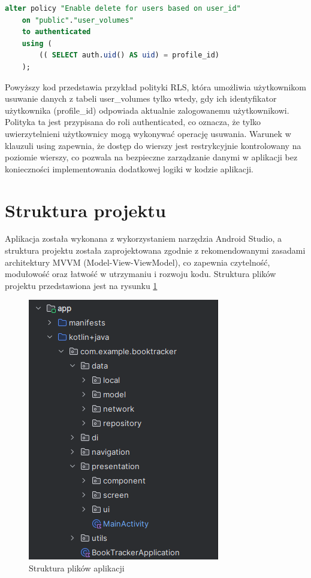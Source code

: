 \documentclass[12pt,twoside]{article}
\begin{document}
\begin{lstlisting}[language=SQL,caption=Polityka RLS "Enable delete for users based on user\_id", label={rlsPolicy}]
	alter policy "Enable delete for users based on user_id"
	on "public"."user_volumes"
	to authenticated
	using (
		(( SELECT auth.uid() AS uid) = profile_id)
	);
\end{lstlisting}
Powyższy kod przedstawia przykład polityki RLS, która umożliwia użytkownikom usuwanie danych z tabeli 
user\_volumes tylko wtedy, gdy ich identyfikator użytkownika (profile\_id) odpowiada aktualnie zalogowanemu 
użytkownikowi. Polityka ta jest przypisana do roli authenticated, co oznacza, że tylko uwierzytelnieni 
użytkownicy mogą wykonywać operację usuwania. Warunek w klauzuli using zapewnia, że dostęp do wierszy jest 
restrykcyjnie kontrolowany na poziomie wierszy, co pozwala na bezpieczne zarządzanie danymi w aplikacji bez 
konieczności implementowania dodatkowej logiki w kodzie aplikacji.


\clearpage

\section{Struktura projektu}

Aplikacja została wykonana z wykorzystaniem narzędzia Android Studio, a struktura projektu została zaprojektowana 
zgodnie z rekomendowanymi zasadami architektury MVVM (Model-View-ViewModel), co zapewnia czytelność, modułowość
oraz łatwość w utrzymaniu i rozwoju kodu. Struktura plików projektu przedstawiona jest na rysunku \ref{Fig:struktura}

\begin{figure}[ht]
	\centering
	\includegraphics{figures/struktura.png}
	\caption{Struktura plików aplikacji}
\label{Fig:struktura}
\end{figure}
\end{document}
